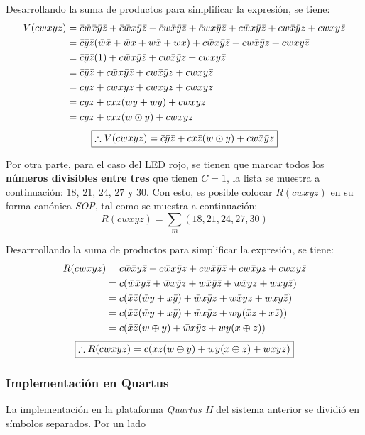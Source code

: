 \documentclass[../procedimientos.tex]{subfiles}
\begin{document}
Desarrollando la suma de productos para simplificar la expresión, se tiene:
\begin{align*}
  V(cwxyz) &= \bar{c}\bar{w}\bar{x}\bar{y}\bar{z} + \bar{c}\bar{w}x\bar{y}\bar{z} + 
  \bar{c}w\bar{x}\bar{y}\bar{z} + \bar{c}wx\bar{y}\bar{z} + c\bar{w}x\bar{y}\bar{z} + 
  cw\bar{x}\bar{y}z + cwxy\bar{z}\\
  &= \bar{c}\bar{y}\bar{z} (\bar{w}\bar{x} + \bar{w}x + w\bar{x} + wx) + 
  c\bar{w}x\bar{y}\bar{z} + cw\bar{x}\bar{y}z + cwxy\bar{z}\\
  &= \bar{c}\bar{y}\bar{z} (1) + c\bar{w}x\bar{y}\bar{z} + cw\bar{x}\bar{y}z + 
  cwxy\bar{z}\\
  &= \bar{c}\bar{y}\bar{z} + c\bar{w}x\bar{y}\bar{z} + cw\bar{x}\bar{y}z + 
  cwxy\bar{z}\\
  &= \bar{c}\bar{y}\bar{z} + c\bar{w}x\bar{y}\bar{z} + cw\bar{x}\bar{y}z + 
  cwxy\bar{z}\\
  &= \bar{c}\bar{y}\bar{z} + cx\bar{z} (\bar{w}\bar{y} + wy) + cw\bar{x}\bar{y}z\\
  &= \bar{c}\bar{y}\bar{z} + cx\bar{z} (w \odot y) + cw\bar{x}\bar{y}z
\end{align*}
\begin{equation*}
  \boxed{
    \therefore V(cwxyz) = \bar{c}\bar{y}\bar{z} + cx\bar{z} (w \odot y) + 
  cw\bar{x}\bar{y}z
  }
\end{equation*}

Por otra parte, para el caso del LED rojo, se tienen que marcar todos los 
\textbf{números divisibles entre tres} que tienen $C=1$, la lista se muestra a 
continuación: $18$, $21$, $24$, $27$ y $30$. Con esto, es posible colocar 
$R(cwxyz)$ en su forma canónica \textit{SOP}, tal como se muestra a 
continuación:
\begin{equation*}
  R(cwxyz) = \sum_m (18, 21, 24, 27, 30)
\end{equation*}

Desarrrollando la suma de productos para simplificar la expresión, se tiene:
\begin{align*}
  R(cwxyz) &= c\bar{w}\bar{x}y\bar{z} + c\bar{w}x\bar{y}z + cw\bar{x}\bar{y}\bar{z} + 
  cw\bar{x}yz + cwxy\bar{z}\\
  &= c(\bar{w}\bar{x}y\bar{z} + \bar{w}x\bar{y}z + w\bar{x}\bar{y}\bar{z} + w\bar{x}yz 
  + wxy\bar{z})\\
  &= c(\bar{x}\bar{z}(\bar{w}y + x\bar{y}) + \bar{w}x\bar{y}z + w\bar{x}yz + 
  wxy\bar{z})\\
  &= c(\bar{x}\bar{z}(\bar{w}y + x\bar{y}) + \bar{w}x\bar{y}z + wy(\bar{x}z + 
  x\bar{z}))\\
  &= c(\bar{x}\bar{z}(w \oplus y) + \bar{w}x\bar{y}z + wy(x \oplus z))
\end{align*}
\begin{equation*}
  \boxed{
    \therefore R(cwxyz) = c(\bar{x}\bar{z}(w \oplus y) + wy(x \oplus z) + 
    \bar{w}x\bar{y}z)
  }
\end{equation*}

\subsubsection{Implementación en Quartus}\label{subs:a_imp}
La implementación en la plataforma \textit{Quartus II} del sistema anterior se 
dividió en símbolos separados. Por un lado
\end{document}
